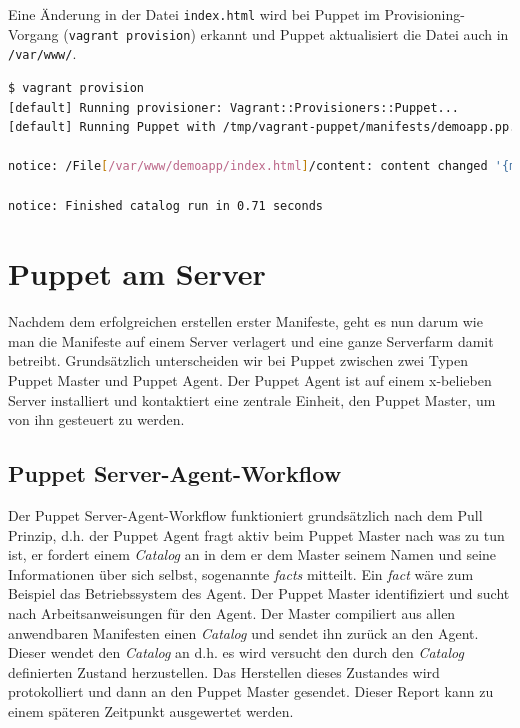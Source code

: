 \documentclass[12pt,a4paper,ngerman]{article}
\begin{document}
Eine Änderung in der Datei \lstinline$index.html$ wird bei Puppet im Provisioning-Vorgang (\lstinline$vagrant provision$) erkannt und Puppet aktualisiert die Datei auch in \lstinline$/var/www/$.
\begin{lstlisting}[language=sh,caption=Puppet Provisioning nach Änderung von index.html, label=provisionapp]
$ vagrant provision
[default] Running provisioner: Vagrant::Provisioners::Puppet...
[default] Running Puppet with /tmp/vagrant-puppet/manifests/demoapp.pp...

notice: /File[/var/www/demoapp/index.html]/content: content changed '{md5}90a8d419b9c7b43b09ba73abebaf8f4c' to '{md5}0a4ee5bb63c3e5c29cc54cf36a4be23c'

notice: Finished catalog run in 0.71 seconds
\end{lstlisting}

\section{Puppet am Server}

Nachdem dem erfolgreichen erstellen erster Manifeste, geht es nun darum wie man die Manifeste auf einem Server verlagert und eine ganze Serverfarm damit betreibt. Grundsätzlich unterscheiden wir bei Puppet zwischen zwei Typen Puppet Master und Puppet Agent. Der Puppet Agent ist auf einem x-belieben Server installiert und kontaktiert eine zentrale Einheit, den Puppet Master, um von ihn gesteuert zu werden. 

\subsection{Puppet Server-Agent-Workflow}

Der Puppet Server-Agent-Workflow funktioniert grundsätzlich nach dem Pull Prinzip, d.h. der Puppet Agent fragt aktiv beim Puppet Master nach was zu tun ist, er fordert einem \textit{Catalog} an in dem er dem Master seinem Namen und seine Informationen über sich selbst, sogenannte \textit{facts} mitteilt. Ein \textit{fact} wäre zum Beispiel das Betriebssystem des Agent. Der Puppet Master identifiziert und sucht nach Arbeitsanweisungen für den Agent. Der Master compiliert aus allen anwendbaren Manifesten einen \textit{Catalog} und sendet ihn zurück an den Agent. Dieser wendet den \textit{Catalog} an d.h. es wird versucht den durch den \textit{Catalog} definierten Zustand herzustellen. Das Herstellen dieses Zustandes wird protokolliert und dann an den Puppet Master gesendet. Dieser Report kann zu einem späteren Zeitpunkt ausgewertet werden.
\end{document}
